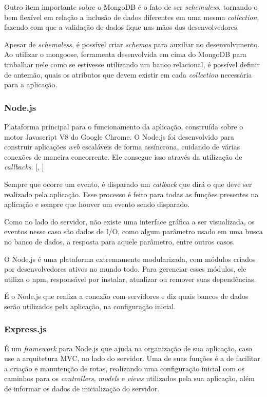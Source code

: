\documentclass[
	12pt,				%
	oneside,			%
	a4paper,			%
	brazil				%
]{abntex2}
\newcommand{\citecustom}[1]{[\citeauthoronline{#1}, \citeyear{#1}]}
\begin{document}
{Outro item importante sobre o MongoDB é o fato de ser \textit{schemaless}, tornando-o bem flexível em relação a inclusão de dados diferentes em uma mesma \textit{collection}, fazendo com que a validação de dados fique nas mãos dos desenvolvedores.

Apesar de \textit{schemaless}, é possível criar \textit{schemas} para auxiliar no desenvolvimento. Ao utilizar o mongoose, ferramenta desenvolvida em cima do MongoDB para trabalhar nele como se estivesse utilizando um banco relacional, é possível definir de antemão, quais os atributos que devem existir em cada \textit{collection} necessária para a aplicação.


\subsubsection{Node.js}

Plataforma principal para o funcionamento da aplicação, construída sobre o motor Javascript V8 do Google Chrome.
O Node.js foi desenvolvido para construir aplicações \textit{web} escaláveis de forma assíncrona, cuidando de várias conexões de maneira concorrente. Ele consegue isso através da utilização de \textit{callbacks}. \citecustom{Node2016}

Sempre que ocorre um evento, é disparado um \textit{callback} que dirá o que deve ser realizado pela aplicação. Esse processo é feito para todas as funções presentes na aplicação e sempre que houver um evento sendo disparado.

Como no lado do servidor, não existe uma interface gráfica a ser visualizada, os eventos nesse caso são dados de I/O, como algum parâmetro usado em uma busca no banco de dados, a resposta para aquele parâmetro, entre outros casos.

O Node.js é uma plataforma extremamente modularizada, com módulos criados por desenvolvedores ativos no mundo todo. Para gerenciar esses módulos, ele utiliza o npm, responsável por instalar, atualizar ou remover suas dependências. 

É o Node.js que realiza a conexão com servidores e diz quais bancos de dados serão utilizados pela aplicação, na configuração inicial.


\subsubsection{Express.js}

É um \textit{framework} para Node.js que ajuda na organização de sua aplicação, caso use a arquitetura MVC, no lado do servidor. Uma de suas funções é a de facilitar a criação e manutenção de rotas, realizando uma configuração inicial com os caminhos para os \textit{controllers}, \textit{models} e \textit{views} utilizados pela sua aplicação, além de informar os dados de inicialização do servidor.


}
\end{document}
